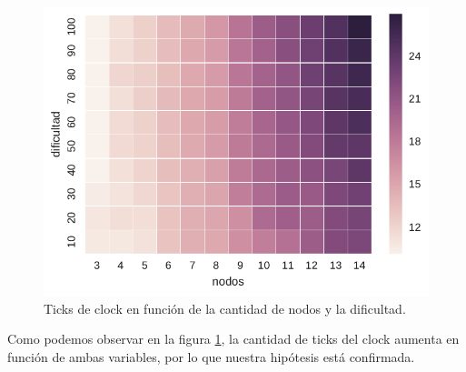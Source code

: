 \begin{figure}[H]
  \begin{center}
    \includegraphics[scale = 0.5]{imagenes/ej1_conHeuristica.pdf}
    \caption{Ticks de clock en función de la cantidad de nodos y la dificultad.}
    \label{fig:ej1_conHeuristica}
  \end{center}
\end{figure}

Como podemos observar en la figura \ref{fig:ej1_conHeuristica}, la cantidad de ticks del clock aumenta en función de ambas variables, por lo que nuestra hipótesis está confirmada.
